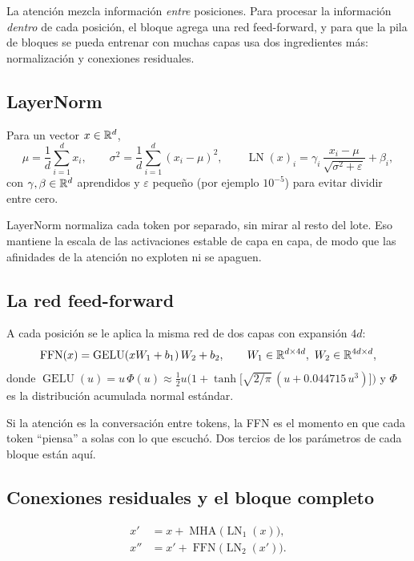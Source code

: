 \documentclass[11pt,letterpaper,oneside]{report}
\begin{document}
La atención mezcla información \emph{entre} posiciones. Para procesar la información \emph{dentro} de cada posición, el bloque agrega una red feed-forward, y para que la pila de bloques se pueda entrenar con muchas capas usa dos ingredientes más: normalización y conexiones residuales.

\subsection{LayerNorm}

\begin{definicion}
Para un vector $x\in\mathbb{R}^d$,
\[
  \mu = \frac1d\sum_{i=1}^d x_i,\qquad \sigma^2 = \frac1d\sum_{i=1}^d (x_i-\mu)^2,\qquad
  \operatorname{LN}(x)_i = \gamma_i\,\frac{x_i - \mu}{\sqrt{\sigma^2 + \varepsilon}} + \beta_i ,
\]
con $\gamma,\beta\in\mathbb{R}^d$ aprendidos y $\varepsilon$ pequeño (por ejemplo $10^{-5}$) para evitar dividir entre cero.
\end{definicion}

LayerNorm normaliza cada token por separado, sin mirar al resto del lote. Eso mantiene la escala de las activaciones estable de capa en capa, de modo que las afinidades de la atención no exploten ni se apaguen.

\subsection{La red feed-forward}

\begin{definicion}[FFN]
A cada posición se le aplica la misma red de dos capas con expansión $4d$:
\[
  \operatorname{FFN}(x) = \operatorname{GELU}(xW_1 + b_1)\,W_2 + b_2,\qquad W_1\in\mathbb{R}^{d\times 4d},\ W_2\in\mathbb{R}^{4d\times d},
\]
donde $\operatorname{GELU}(u) = u\,\Phi(u) \approx \tfrac12 u\big(1+\tanh\!\big[\sqrt{2/\pi}\,(u + 0.044715\,u^3)\big]\big)$ y $\Phi$ es la distribución acumulada normal estándar.
\end{definicion}

Si la atención es la conversación entre tokens, la FFN es el momento en que cada token ``piensa'' a solas con lo que escuchó. Dos tercios de los parámetros de cada bloque están aquí.

\subsection{Conexiones residuales y el bloque completo}

\begin{definicion}
\begin{align*}
  x' &= x + \operatorname{MHA}\big(\operatorname{LN}_1(x)\big),\\
  x'' &= x' + \operatorname{FFN}\big(\operatorname{LN}_2(x')\big).
\end{align*}
\end{definicion}
\end{document}
